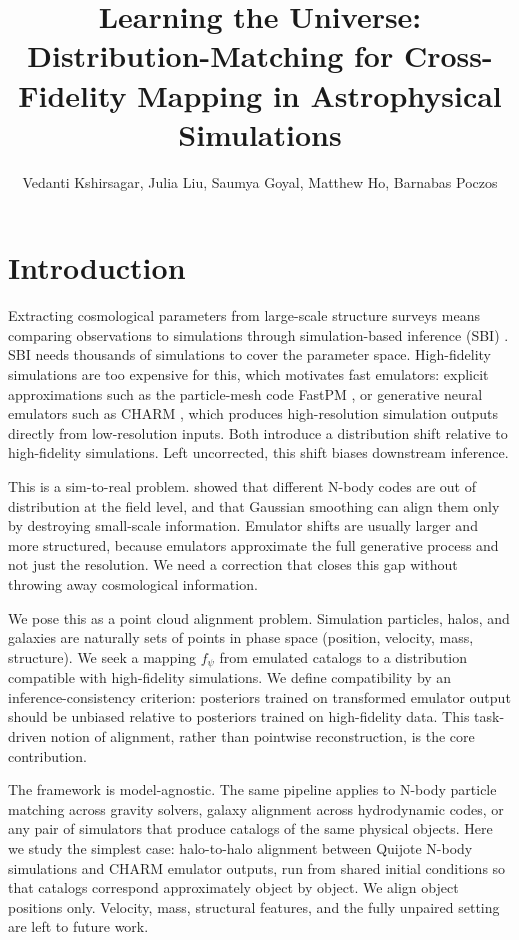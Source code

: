 \documentclass{article} %
\title{Learning the Universe: Distribution-Matching for Cross-Fidelity Mapping in Astrophysical Simulations}
\author{Vedanti Kshirsagar, Julia Liu, Saumya Goyal, Matthew Ho, Barnabas Poczos}
\date{}
\begin{document}
\maketitle

\section{Introduction}

Extracting cosmological parameters from large-scale structure surveys means
comparing observations to simulations through simulation-based inference (SBI)
\cite{cranmer2020frontier}. SBI needs thousands of simulations to cover the
parameter space. High-fidelity simulations are too expensive for this, which
motivates fast emulators: explicit approximations such as the particle-mesh code
FastPM \cite{feng2016fastpm}, or generative neural emulators such as CHARM
\cite{pandey2025creating}, which produces high-resolution simulation outputs
directly from low-resolution inputs. Both introduce a distribution shift relative
to high-fidelity simulations. Left uncorrected, this shift biases downstream
inference.

This is a sim-to-real problem. \cite{bayer2025field} showed that different N-body
codes are out of distribution at the field level, and that Gaussian smoothing can
align them only by destroying small-scale information. Emulator shifts are usually
larger and more structured, because emulators approximate the full generative
process and not just the resolution. We need a correction that closes this gap
without throwing away cosmological information.

We pose this as a point cloud alignment problem. Simulation particles, halos, and
galaxies are naturally sets of points in phase space (position, velocity, mass,
structure). We seek a mapping $f_\psi$ from emulated catalogs to a distribution
compatible with high-fidelity simulations. We define compatibility by an
inference-consistency criterion: posteriors trained on transformed emulator output
should be unbiased relative to posteriors trained on high-fidelity data. This
task-driven notion of alignment, rather than pointwise reconstruction, is the core
contribution.

The framework is model-agnostic. The same pipeline applies to N-body particle
matching across gravity solvers, galaxy alignment across hydrodynamic codes, or any
pair of simulators that produce catalogs of the same physical objects. Here we
study the simplest case: halo-to-halo alignment between Quijote N-body simulations
and CHARM emulator outputs, run from shared initial conditions so that catalogs
correspond approximately object by object. We align object positions only.
Velocity, mass, structural features, and the fully unpaired setting are left to
future work.
\end{document}
